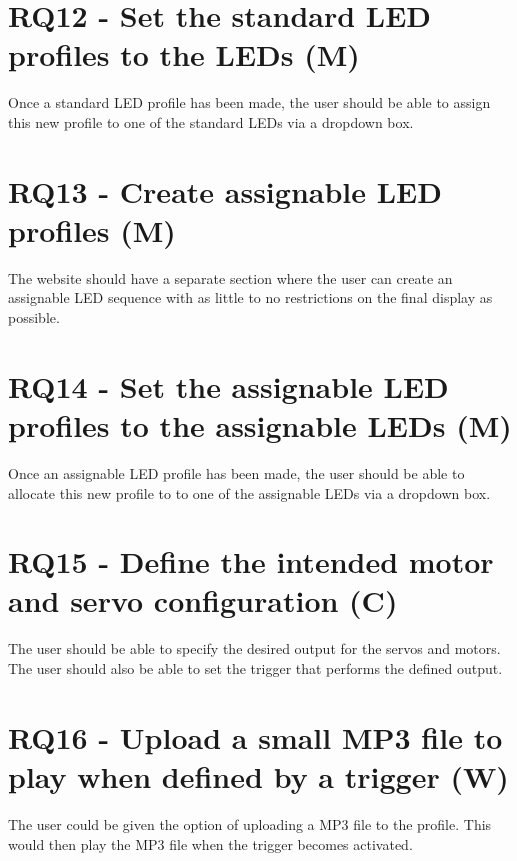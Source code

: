 \section {RQ12 - Set the standard LED profiles to the LEDs (M)}
Once a standard LED profile has been made, the user should be able to assign this new profile to one of the standard LEDs via a dropdown box.

\section {RQ13 - Create assignable LED profiles (M)}
The website should have a separate section where the user can create an assignable LED sequence with as little to no restrictions on the final display as possible. 

\section {RQ14 - Set the assignable LED profiles to the assignable LEDs (M)}
Once an assignable LED profile has been made, the user should be able to allocate this new profile to to one of the assignable LEDs via a dropdown box.

\section {RQ15 - Define the intended motor and servo configuration (C)}
The user should be able to specify the desired output for the servos and motors. The user should also be able to set the trigger that performs the defined output.

\section {RQ16 - Upload a small MP3 file to play when defined by a trigger (W)}
The user could be given the option of uploading a MP3 file to the profile. This would then play the MP3 file when the trigger becomes activated.



